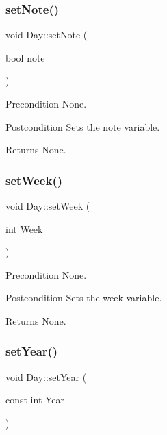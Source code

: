 \subsubsection{\texorpdfstring{set\+Note()}{setNote()}}
{\footnotesize\ttfamily void Day\+::set\+Note (\begin{DoxyParamCaption}\item[{bool}]{note }\end{DoxyParamCaption})}

\begin{DoxyPrecond}{Precondition}
None. 
\end{DoxyPrecond}
\begin{DoxyPostcond}{Postcondition}
Sets the note variable. 
\end{DoxyPostcond}
\begin{DoxyReturn}{Returns}
None. 
\end{DoxyReturn}
\hypertarget{class_day_abd9ffcfab90af3e2defaa2491a3761bb}{}\label{class_day_abd9ffcfab90af3e2defaa2491a3761bb} 
\subsubsection{\texorpdfstring{set\+Week()}{setWeek()}}
{\footnotesize\ttfamily void Day\+::set\+Week (\begin{DoxyParamCaption}\item[{int}]{Week }\end{DoxyParamCaption})}

\begin{DoxyPrecond}{Precondition}
None. 
\end{DoxyPrecond}
\begin{DoxyPostcond}{Postcondition}
Sets the week variable. 
\end{DoxyPostcond}
\begin{DoxyReturn}{Returns}
None. 
\end{DoxyReturn}
\hypertarget{class_day_a9fc013d905327fd70003970125247d91}{}\label{class_day_a9fc013d905327fd70003970125247d91} 
\subsubsection{\texorpdfstring{set\+Year()}{setYear()}}
{\footnotesize\ttfamily void Day\+::set\+Year (\begin{DoxyParamCaption}\item[{const int}]{Year }\end{DoxyParamCaption})}

